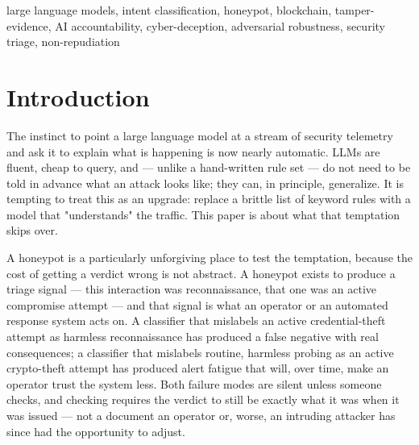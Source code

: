 \documentclass[journal,10pt,twocolumn]{IEEEtran}
\begin{document}
\begin{IEEEkeywords}
large language models, intent classification, honeypot, blockchain, tamper-evidence, AI accountability, cyber-deception, adversarial robustness, security triage, non-repudiation
\end{IEEEkeywords}

\section{Introduction}

The instinct to point a large language model at a stream of security telemetry and ask it to explain what is happening is now nearly automatic. LLMs are fluent, cheap to query, and --- unlike a hand-written rule set --- do not need to be told in advance what an attack looks like; they can, in principle, generalize. It is tempting to treat this as an upgrade: replace a brittle list of keyword rules with a model that "understands" the traffic. This paper is about what that temptation skips over.

A honeypot is a particularly unforgiving place to test the temptation, because the cost of getting a verdict wrong is not abstract. A honeypot exists to produce a triage signal --- this interaction was reconnaissance, that one was an active compromise attempt --- and that signal is what an operator or an automated response system acts on. A classifier that mislabels an active credential-theft attempt as harmless reconnaissance has produced a false negative with real consequences; a classifier that mislabels routine, harmless probing as an active crypto-theft attempt has produced alert fatigue that will, over time, make an operator trust the system less. Both failure modes are silent unless someone checks, and checking requires the verdict to still be exactly what it was when it was issued --- not a document an operator or, worse, an intruding attacker has since had the opportunity to adjust.
\end{document}
